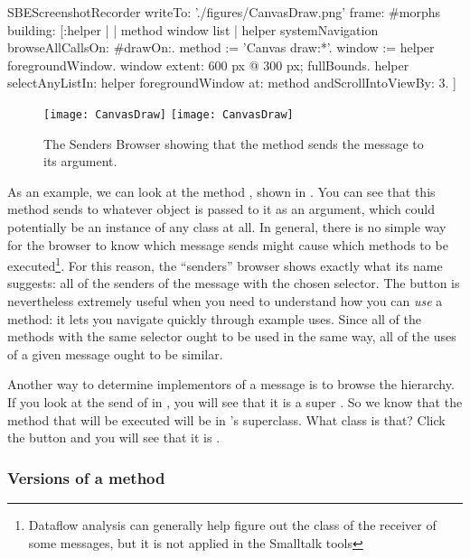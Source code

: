 \documentclass[a4paper,10pt,twoside]{book}
\begin{document}
\begin{ExecuteSmalltalkScript}
SBEScreenshotRecorder writeTo: './figures/CanvasDraw.png' frame: #morphs building: [:helper |
	| method window list |
	helper systemNavigation browseAllCallsOn: #drawOn:.
	method := 'Canvas draw:*'.
	window := helper foregroundWindow.
	window extent: 600 px @ 300 px; fullBounds.
	helper selectAnyListIn: helper foregroundWindow at: method andScrollIntoViewBy: 3.
]
\end{ExecuteSmalltalkScript}
\begin{figure}[htbp]
	\begin{center}
   \ifluluelse
		{\texttt{[image: CanvasDraw]}}
		{\texttt{[image: CanvasDraw]}}
	\end{center}
	\caption{The Senders Browser showing that the  method sends the  message to its argument.	\label{fig:CanvasDraw}}
\end{figure}

As an example, we can look at the method , shown in .
You can see that this method sends  to whatever object is passed to it as an argument, which could potentially be an instance of any class at all.
In general, there is no simple way for the browser to know which message sends might cause which methods to be executed\footnote{Dataflow analysis can generally help figure out the class of the receiver of some messages, but it is not applied in the Smalltalk tools}.
For this reason,  the ``senders'' browser shows exactly what its name suggests: all of the senders of the message with the chosen selector.
The  button is nevertheless extremely useful when you need to understand how you can \emph{use} a method: it lets you navigate quickly through example uses.
Since all of the methods with the same selector ought to be used in the same way, all of the uses of a given message ought to be similar.

Another way to determine implementors of a message is to browse the hierarchy. If you look at the send of  in , you will see that it is a super .
So we know that the method that will be executed will be in 's superclass.
What class is that?
Click the  button and you will see that it is .


\subsubsection{Versions of a method}
\label{sec:versions}
\end{document}
